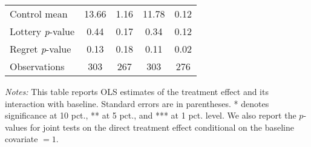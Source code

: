 \begin{table}[htbp]
{\begin{threeparttable}
\begin{tabular}{l*{4}{c}}
Control mean    &    13.66         &     1.16         &    11.78         &     0.12         \\
Lottery \emph{p}-value&     0.44         &     0.17         &     0.34         &     0.12         \\
Regret \emph{p}-value&     0.13         &     0.18         &     0.11         &     0.02         \\
Observations    &      303         &      267         &      303         &      276         \\
\bottomrule \end{tabular} \begin{tablenotes}[flushleft] \footnotesize \item \emph{Notes:} This table reports OLS estimates of the treatment effect and its interaction with baseline. Standard errors are in parentheses. * denotes significance at 10 pct., ** at 5 pct., and *** at 1 pct. level. We also report the \(p\)-values for joint tests on the direct treatment effect conditional on the baseline covariate $= 1$. \end{tablenotes} \end{threeparttable} } \end{table}

